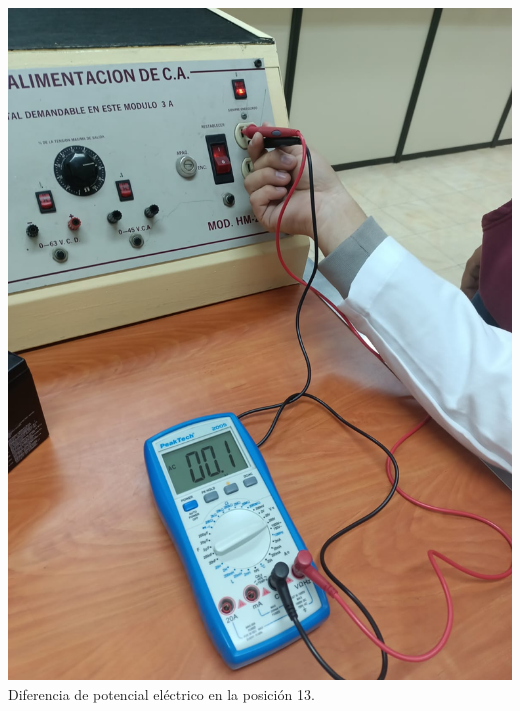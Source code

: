 \documentclass[10pt]{article}
\begin{document}
\begin{multicols}{2}
\begin{center}
	\includegraphics[scale = 0.1]{Imagenes/Fotos/13.jpeg}\\
	Diferencia de potencial eléctrico en la posición 13.	

\end{center}
\end{multicols}
\end{document}
